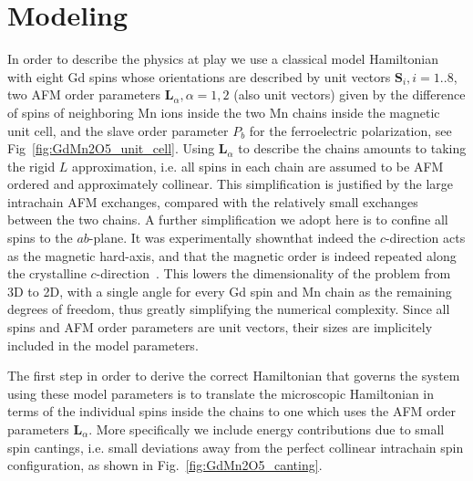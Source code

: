 \section{Modeling}
In order to describe the physics at play we use a classical model Hamiltonian with eight Gd spins whose orientations are described by unit vectors $\mathbf{S}_i, i=1..8$, two AFM order parameters $\mathbf{L}_\alpha, \alpha=1,2$ (also unit vectors) given by the difference of spins of neighboring Mn ions inside the two Mn chains inside the magnetic unit cell, and the slave order parameter $P_b$ for the ferroelectric polarization, see Fig~\ref{fig:GdMn2O5_unit_cell}.
Using $\mathbf{L}_\alpha$ to describe the chains amounts to taking the rigid $L$ approximation, i.e. all spins in each chain are assumed to be AFM ordered and approximately collinear. This simplification is justified by the large intrachain AFM exchanges, compared with the relatively small exchanges between the two chains.
A further simplification we adopt here is to confine all spins to the $ab$-plane. It was experimentally shownthat indeed the $c$-direction acts as the magnetic hard-axis, and that the magnetic order is indeed repeated along the crystalline $c$-direction~\cite{Lee13}.
This lowers the dimensionality of the problem from 3D to 2D, with a single angle for every Gd spin and Mn chain as the remaining degrees of freedom, thus greatly simplifying the numerical complexity.
Since all spins and AFM order parameters are unit vectors, their sizes are implicitely included in the model parameters.

The first step in order to derive the correct Hamiltonian that governs the system using these model parameters is to translate the microscopic Hamiltonian in terms of the individual spins inside the chains to one which uses the AFM order parameters $\mathbf{L}_\alpha$.
More specifically we include energy contributions due to small spin cantings, i.e. small deviations away from the perfect collinear intrachain spin configuration, as shown in Fig.~\ref{fig:GdMn2O5_canting}.

\begin{figure*}[h]
    \centering
    \label{fig:GdMn2O5_canting}
	\caption{{\bf Energy contributions due to spin canting.}\\ Zeeman (a) and Heisenberg exchange (b) energy gains when Mn spins (black arrows) are canted slightly with angle $\delta \theta$. In each panel the blue arrows signify the canted spins, compared with the perfect collinear configuration. In the Zeeman term (a) the spins inside one chain are canted slightly towards the field (red), leading to a weak ferromagnetic moment that couples to it, thus gaining energy. The interchain vs intrachain AFM exchange is optimized through a small canting of the two neighboring ferromagnetically oriented spins that invevitably arise due to the geometric frustration.}
\end{figure*}

